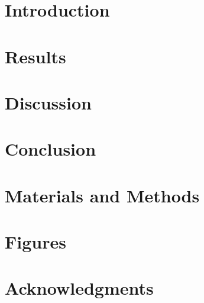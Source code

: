 \documentclass{article}
\begin{document}
\maketitle

\begin{abstract}
  \lipsum[1]{}
\end{abstract}

\section{Introduction}
\lipsum[2-5]{}

\section{Results}
\lipsum[6-10]{}

\section{Discussion}
\lipsum[11-15]{}

\section{Conclusion}
\lipsum[16-20]{}

\section{Materials and Methods}
\lipsum[21-25]{}

\newpage
\section*{Figures}


\pagebreak

\section*{Acknowledgments}
\glsresetall{}



\end{document}
